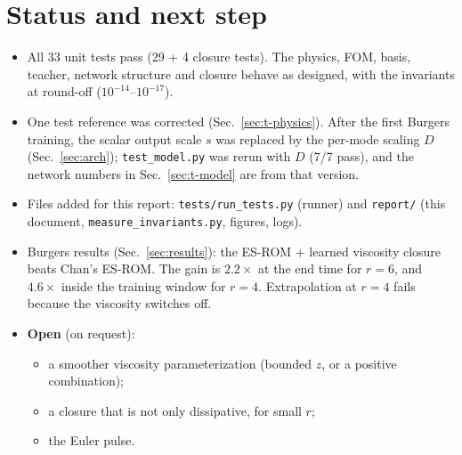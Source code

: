 \documentclass[11pt,a4paper]{article}
\newcommand{\code}[1]{\texttt{\small #1}}
\begin{document}
\section{Status and next step}
\begin{itemize}
\item All 33 unit tests pass (29 + 4 closure tests). The physics, FOM, basis, teacher, network structure and closure behave as designed, with the invariants at round-off ($10^{-14}$--$10^{-17}$).
\item One test reference was corrected (Sec.~\ref{sec:t-physics}). After the first Burgers training, the scalar output scale $s$ was replaced by the per-mode scaling $D$ (Sec.~\ref{sec:arch}); \code{test\_model.py} was rerun with $D$ (7/7 pass), and the network numbers in Sec.~\ref{sec:t-model} are from that version.
\item Files added for this report: \code{tests/run\_tests.py} (runner) and \code{report/} (this document, \code{measure\_invariants.py}, figures, logs).
\item Burgers results (Sec.~\ref{sec:results}): the ES-ROM + learned viscosity closure beats Chan's ES-ROM. The gain is $2.2\times$ at the end time for $r=6$, and $4.6\times$ inside the training window for $r=4$. Extrapolation at $r=4$ fails because the viscosity switches off.
\item \textbf{Open} (on request):
  \begin{itemize}
  \item a smoother viscosity parameterization (bounded $z$, or a positive combination);
  \item a closure that is not only dissipative, for small $r$;
  \item the Euler pulse.
  \end{itemize}
\end{itemize}
\end{document}
